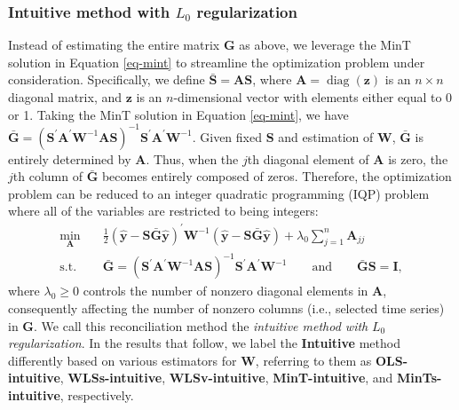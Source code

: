 \documentclass[
  11pt]{article}
\theoremstyle{plain}
\theoremstyle{remark}
\begin{document}
\subsubsection*{\texorpdfstring{Intuitive method with \(L_0\)
regularization}{Intuitive method with L\_0 regularization}}\label{intuitive-method-with-l_0-regularization}

Instead of estimating the entire matrix \(\bm{G}\) as above, we leverage
the MinT solution in Equation \eqref{eq-mint} to streamline the
optimization problem under consideration. Specifically, we define
\(\bar{\bm{S}} = \bm{A}\bm{S}\), where
\(\bm{A} = \operatorname{diag}(\bm{z})\) is an \(n \times n\) diagonal
matrix, and \(\bm{z}\) is an \(n\)-dimensional vector with elements
either equal to 0 or 1. Taking the MinT solution in Equation
\eqref{eq-mint}, we have
\(\bar{\bm{G}} = (\bm{S}^{\prime}\bm{A}^{\prime}\bm{W}^{-1}\bm{A}\bm{S})^{-1}\bm{S}^{\prime}\bm{A}^{\prime}\bm{W}^{-1}\).
Given fixed \(\bm{S}\) and estimation of \(\bm{W}\), \(\bar{\bm{G}}\) is
entirely determined by \(\bm{A}\). Thus, when the \(j\)th diagonal
element of \(\bm{A}\) is zero, the \(j\)th column of \(\bar{\bm{G}}\)
becomes entirely composed of zeros. Therefore, the optimization problem
can be reduced to an integer quadratic programming (IQP) problem where
all of the variables are restricted to being integers: \begin{align*}
\min_{\bm{A}} \quad & \frac{1}{2}\left(\hat{\bm{y}}-\bm{S}\bar{\bm{G}}\hat{\bm{y}}\right)^{\prime} \bm{W}^{-1}\left(\hat{\bm{y}}-\bm{S}\bar{\bm{G}}\hat{\bm{y}}\right) + \lambda_0 \sum_{j=1}^n \bm{A}_{jj} \\
\text{s.t.} \quad & \bar{\bm{G}} = (\bm{S}^{\prime}\bm{A}^{\prime}\bm{W}^{-1}\bm{A}\bm{S})^{-1}\bm{S}^{\prime}\bm{A}^{\prime}\bm{W}^{-1} \qquad\text{and}\qquad \bar{\bm{G}}\bm{S} = \bm{I},
\end{align*} where \(\lambda_0 \geq 0\) controls the number of nonzero
diagonal elements in \(\bm{A}\), consequently affecting the number of
nonzero columns (i.e., selected time series) in \(\bm{G}\). We call this
reconciliation method the \emph{intuitive method with} \(L_0\)
\emph{regularization}. In the results that follow, we label the
\textbf{Intuitive} method differently based on various estimators for
\(\bm{W}\), referring to them as \textbf{OLS-intuitive},
\textbf{WLSs-intuitive}, \textbf{WLSv-intuitive},
\textbf{MinT-intuitive}, and \textbf{MinTs-intuitive}, respectively.
\end{document}
